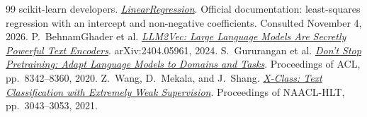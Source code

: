 \documentclass{article}
\begin{document}
\begin{thebibliography}{99}
 scikit-learn developers. \href{https://scikit-learn.org/stable/modules/generated/sklearn.linear_model.LinearRegression.html}{\emph{LinearRegression}}. Official documentation: least-squares regression with an intercept and non-negative coefficients. Consulted November 4, 2026.
 P.~BehnamGhader et al. \href{https://arxiv.org/abs/2404.05961}{\emph{LLM2Vec: Large Language Models Are Secretly Powerful Text Encoders}}. arXiv:2404.05961, 2024.
 S.~Gururangan et al. \href{https://aclanthology.org/2020.acl-main.740/}{\emph{Don't Stop Pretraining: Adapt Language Models to Domains and Tasks}}. Proceedings of ACL, pp.~8342--8360, 2020.
 Z.~Wang, D.~Mekala, and J.~Shang. \href{https://aclanthology.org/2021.naacl-main.242/}{\emph{X-Class: Text Classification with Extremely Weak Supervision}}. Proceedings of NAACL-HLT, pp.~3043--3053, 2021.
\end{thebibliography}
\end{document}
